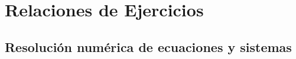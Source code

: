 \documentclass[12pt]{book}
\begin{document}

    
    

    \renewcommand{\theejercicio}{%
    \ifnum\value{section}=0 %
        \arabic{ejercicio}%
    \else
        \thesubsection.\arabic{ejercicio}%
    \fi
    }

    \fancyhead[R]{\helv \nouppercase{\rightmark}}
    \chapter{Relaciones de Ejercicios}
    \section{Resolución numérica de ecuaciones y sistemas}
    
    
\end{document}
